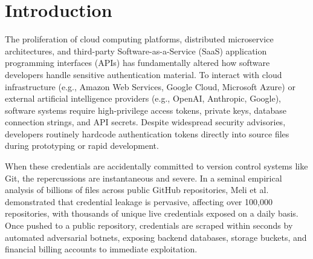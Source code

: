 \section{Introduction}
\label{sec:introduction}

The proliferation of cloud computing platforms, distributed microservice architectures, and third-party Software-as-a-Service (SaaS) application programming interfaces (APIs) has fundamentally altered how software developers handle sensitive authentication material. To interact with cloud infrastructure (e.g., Amazon Web Services, Google Cloud, Microsoft Azure) or external artificial intelligence providers (e.g., OpenAI, Anthropic, Google), software systems require high-privilege access tokens, private keys, database connection strings, and API secrets. Despite widespread security advisories, developers routinely hardcode authentication tokens directly into source files during prototyping or rapid development.

When these credentials are accidentally committed to version control systems like Git, the repercussions are instantaneous and severe. In a seminal empirical analysis of billions of files across public GitHub repositories, Meli et al.~\cite{meli2019howbad} demonstrated that credential leakage is pervasive, affecting over 100,000 repositories, with thousands of unique live credentials exposed on a daily basis. Once pushed to a public repository, credentials are scraped within seconds by automated adversarial botnets, exposing backend databases, storage buckets, and financial billing accounts to immediate exploitation.

